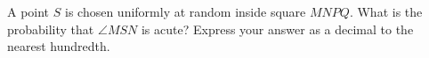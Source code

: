 A point $S$ is chosen uniformly at random inside square $MNPQ$. What is the probability that $\angle MSN$ is acute? Express your answer as a decimal to the nearest hundredth.
